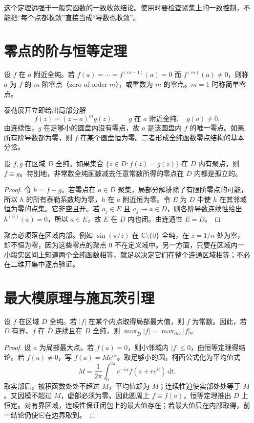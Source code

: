 \documentclass[UTF8,12pt,a4paper,fontset=fandol]{ctexbook}
\begin{document}
这个定理远强于一般实函数的一致收敛结论。使用时要检查紧集上的一致控制，不能把“每个点都收敛”直接当成“导数也收敛”。

\section{零点的阶与恒等定理}

\begin{definition}[零点的阶]
设 $f$ 在 $a$ 附近全纯。若 $f(a)=\cdots=f^{(m-1)}(a)=0$ 而 $f^{(m)}(a)\ne0$，则称 $a$ 为 $f$ 的 $m$ 阶零点（zero of order $m$），或重数为 $m$ 的零点。$m=1$ 时称简单零点。
\end{definition}

泰勒展开立即给出局部分解
\begin{equation}
 f(z)=(z-a)^m g(z),\qquad g\text{ 在 }a\text{ 附近全纯},\quad g(a)\ne0.
 \label{eq:cv-zero-factor}
\end{equation}
由连续性，$g$ 在足够小的圆盘内没有零点，故 $a$ 是该圆盘内 $f$ 的唯一零点。如果所有阶导数都为零，则 $f$ 在某个圆盘恒为零。二者形成全纯函数零点结构的基本分岔。

\begin{theorem}[恒等定理]
\label{thm:cv-identity}
设 $f,g$ 在区域 $D$ 全纯。如果集合 $\{z\in D:f(z)=g(z)\}$ 在 $D$ 内有聚点，则 $f\equiv g$。特别地，非常数全纯函数减去任意常数所得的零点在 $D$ 内都是孤立的。
\end{theorem}
\begin{proof}
令 $h=f-g$。若零点在 $a\in D$ 聚集，局部分解排除了有限阶零点的可能，所以 $h$ 的所有泰勒系数均为零，$h$ 在 $a$ 附近恒为零。令 $E$ 为 $D$ 中使 $h$ 在其邻域恒为零的点集。它非空且开。若 $a_j\in E$ 且 $a_j\to a\in D$，则各阶导数连续性给出 $h^{(n)}(a)=0$，所以 $a\in E$，故 $E$ 在 $D$ 内也闭。由连通性 $E=D$。
\end{proof}

聚点必须落在区域内部。例如 $\sin(\pi/z)$ 在 $\mathbb C\setminus\{0\}$ 全纯，在 $z=1/n$ 处为零，却不恒为零，因为这些零点的聚点 $0$ 不在定义域中。另一方面，只要在区域内一小段实区间上知道两个全纯函数相等，就足以决定它们在整个连通区域相等；不必在二维开集中逐点验证。

\section{最大模原理与施瓦茨引理}

\begin{theorem}[最大模原理]
\label{thm:cv-maximum}
设 $f$ 在区域 $D$ 全纯。若 $|f|$ 在某个内点取得局部最大值，则 $f$ 为常数。因此，若 $D$ 有界、$f$ 在 $\overline D$ 连续且在 $D$ 全纯，则 $\max_{\overline D}|f|=\max_{\partial D}|f|$。
\end{theorem}
\begin{proof}
设 $a$ 为局部最大点。若 $f(a)=0$，则小邻域内 $|f|\le0$，由恒等定理得结论。若 $f(a)\ne0$，写 $f(a)=Me^{i\alpha}$。取足够小的圆，柯西公式化为平均值式
\[
 M=\frac1{2\pi}\int_0^{2\pi}e^{-i\alpha}f(a+re^{it})\,\mathrm dt.
\]
取实部后，被积函数处处不超过 $M$，平均值却为 $M$；连续性迫使实部处处等于 $M$。又因模不超过 $M$，虚部必须为零。因此圆周上 $f\equiv f(a)$，恒等定理推出 $D$ 上恒定。对有界区域，连续性保证闭包上的最大值存在；若最大值只在内部取得，前一结论仍使它在边界取到。
\end{proof}
\end{document}
